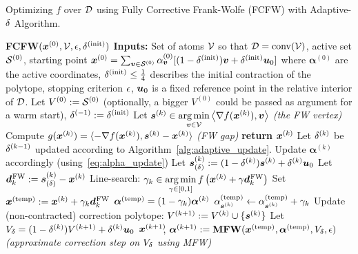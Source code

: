 %
\begin{algorithm}
	\caption{Optimizing $f$ over $\mathcal{D}$ using Fully Corrective Frank-Wolfe (FCFW) with Adaptive-$\delta$ Algorithm.}
	\label{alg:adaptive_eps}
	\begin{algorithmic}[1]
		\STATE \textbf{FCFW}$(\bm{x}^{(0)}, \mathcal{V}, \epsilon, \delta^{(\mathrm{init})})$
		\STATE \textbf{Inputs:} Set of atoms $\mathcal{V}$ so that $\mathcal{D} = \operatorname*{conv}({\mathcal{V}})$, active set $\mathcal{S}^{(0)}$, starting point $\bm{x}^{(0)}= \sum_{\bm{v} \in \mathcal{S}^{(0)}} \alpha^{(0)}_{\bm{v}}  [(1-\delta^{(\mathrm{init})})\bm{v} + \delta^{(\mathrm{init})} \bm{u}_0]$ where $\bm{\alpha}^{(0)}$ are the active coordinates, $\delta^{(\mathrm{init})}\leq \frac{1}{4}$ describes the initial contraction of the polytope, stopping criterion $\epsilon$, $\bm{u}_0$ is a fixed reference point in the relative interior of $\mathcal{D}$.
		\STATE Let $V^{(0)} := \mathcal{S}^{(0)}$ \quad (optionally, a bigger $V^{(0)}$ could be passed as argument for a warm start), $\delta^{(-1)} := \delta^{(\mathrm{init})}$ 
		\STATE Let $\bm{s}^{(k)} \in \displaystyle\operatorname*{\arg\min}_{\bm{v} \in \mathcal{V}} \textstyle\left\langle \nabla f(\bm{x}^{(k)}) , \bm{v} \right\rangle$ \qquad \emph{\small(the FW vertex)} 
		\STATE Compute $g(\bm{x}^{(k)})=\langle-\nabla f(\bm{x}^{(k)}),\bm{s}^{(k)}-\bm{x}^{(k)}\rangle$ \quad \emph{\small(FW gap)} 
		\IF{$\gk \leq \stopCrit$}
			\STATE \textbf{return} $\bm{x}^{(k)}$
		\ENDIF
%
%
%
%
%
%
%
		\STATE Let $\delta^{(k)}$ be $\delta^{(k-1)}$ updated according to Algorithm~\ref{alg:adaptive_update}.
		\STATE Update $\bm{\alpha}^{(k)}$ accordingly (using~\eqref{eq:alpha_update})
		\STATE Let $\bm{s}^{(k)}_{(\delta)} := (1-\delta^{(k)})\bm{s}^{(k)} + \delta^{(k)} \bm{u}_0$ 
		\STATE Let $\bm{d}_k^{\hspace{0.05em}\textnormal{FW}} := \bm{s}^{(k)}_{(\delta)} - \bm{x}^{(k)}$ 
		\STATE Line-search: $\gamma_k \in \displaystyle\operatorname*{\arg\min}_{\gamma \in [0,1]} \textstyle f\left(\bm{x}^{(k)} + \gamma \bm{d}_k^{\hspace{0.05em}\textnormal{FW}}\right)$
		\STATE Set $\bm{x}^{(\mathrm{temp)}} := \bm{x}^{(k)} + \gamma_k  \bm{d}_k^{\hspace{0.05em}\textnormal{FW}}$  
		\STATE $\bm{\alpha}^{(\mathrm{temp})} = (1-\gamma_k) \bm{\alpha}^{(k)}$
		\STATE $\alpha_{\bm{s}^{(k)}}^{(\mathrm{temp)}} \leftarrow \alpha_{\bm{s}^{(k)}}^{(\mathrm{temp)}} + \gamma_k$ 
		\STATE Update (non-contracted) correction polytope: $V^{(k+1)} := V^{(k)} \cup \{ \bm{s}^{(k)} \}$
		\STATE Let $V_\delta = (1-\delta^{(k)})V^{(k+1)} + \delta^{(k)} \bm{u}_0$ 
		\STATE $\bm{x}^{(k+1)}\!\!$, $\bm{\alpha}^{(k+1)} := \textbf{\textrm{MFW}}(\bm{x}^{(\mathrm{temp)}},\bm{\alpha}^{(\mathrm{temp})}, V_\delta, \epsilon)$ \quad \emph{\small (approximate correction step on $V_\delta$ using MFW)}
	\ENDFOR
	\end{algorithmic}
\end{algorithm}



%
%
%
%
%
%
%
%
%
%
%
%
%
%
%

